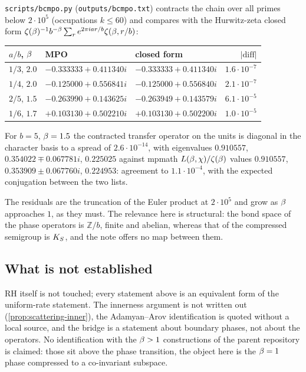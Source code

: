 \begin{numerical}
\label{num:bc-mpo}
\texttt{scripts/bcmpo.py} (\texttt{outputs/bcmpo.txt}) contracts the chain over all primes
below $2\cdot10^5$ (occupations $k\le60$) and compares with the Hurwitz-zeta closed form
$\zeta(\beta)^{-1}b^{-\beta}\sum_r e^{2\pi i a r/b}\zeta(\beta,r/b)$:
\begin{center}
\begin{tabular}{lll r}
\toprule
$a/b$, $\beta$ & MPO & closed form & $|\text{diff}|$ \\
\midrule
$1/3$, $2.0$ & $-0.333333+0.411340i$ & $-0.333333+0.411340i$ & $1.6\cdot10^{-7}$ \\
$1/4$, $2.0$ & $-0.125000+0.556841i$ & $-0.125000+0.556840i$ & $2.1\cdot10^{-7}$ \\
$2/5$, $1.5$ & $-0.263990+0.143625i$ & $-0.263949+0.143579i$ & $6.1\cdot10^{-5}$ \\
$1/6$, $1.7$ & $+0.103130+0.502210i$ & $+0.103130+0.502200i$ & $1.0\cdot10^{-5}$ \\
\bottomrule
\end{tabular}
\end{center}
For $b=5$, $\beta=1.5$ the contracted transfer operator on the units is diagonal in the
character basis to a spread of $2.6\cdot10^{-14}$, with eigenvalues $0.910557$,
$0.354022\mp0.067781i$, $0.225025$ against mpmath $L(\beta,\chi)/\zeta(\beta)$
values $0.910557$, $0.353909\pm0.067760i$, $0.224953$: agreement to $1.1\cdot10^{-4}$,
with the expected conjugation between the two lists.
\end{numerical}

The residuals are the truncation of the Euler product at $2\cdot10^5$ and grow as
$\beta$ approaches $1$, as they must. The relevance here is structural: the bond space
of the phase operators is $\mathbb Z/b$, finite and abelian, whereas that of the
compressed semigroup is $K_S$, and the note offers no map between them.

\subsection{What is not established}

RH itself is not touched; every statement above is an equivalent form of the uniform-rate
statement. The innerness argument is not written out (\cref{prop:scattering-inner}), the
Adamyan--Arov identification is quoted without a local source, and the bridge is a
statement about boundary phases, not about the operators. No identification with the
$\beta>1$ constructions of the parent repository is claimed: those sit above the phase
transition, the object here is the $\beta=1$ phase compressed to a co-invariant
subspace.

